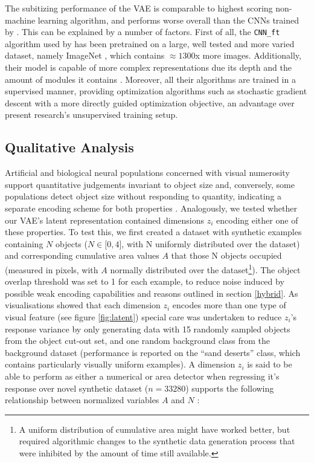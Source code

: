 \documentclass[twocolumn]{article}
\begin{document}
{The subitizing performance of the VAE is comparable to highest scoring
non-machine learning algorithm, and performs worse overall than the CNNs
trained by \citet{zhang2016salient}. This can be explained by a number
of factors. First of all, the \texttt{CNN\_ft} algorithm used by
\citet{zhang2016salient} has been pretrained on a large, well tested and
more varied dataset, namely ImageNet \citep{russakovsky2015imagenet},
which contains \(\approx 1300\)x more images. Additionally, their model
is capable of more complex representations due its depth and the amount
of modules it contains \citep[the applied model from][ uses 22 compared
to the 12 in our approach]{szegedy2015going}. Moreover, all their
algorithms are trained in a supervised manner, providing optimization
algorithms such as stochastic gradient descent with a more directly
guided optimization objective, an advantage over present research's
unsupervised training setup.

\hypertarget{qualitative-analysis}{%
\subsection{Qualitative Analysis}\label{qualitative-analysis}}

Artificial and biological neural populations concerned with visual
numerosity support quantitative judgements invariant to object size and,
conversely, some populations detect object size without responding to
quantity, indicating a separate encoding scheme for both properties
\citep{stoianov2012, harvey2013topographic}. Analogously, we tested
whether our VAE's latent representation contained dimensions \(z_i\)
encoding either one of these properties. To test this, we first created
a dataset with synthetic examples containing \(N\) objects
(\(N \in \lbrack 0, 4\rbrack\), with N uniformly distributed over the
dataset) and corresponding cumulative area values \(A\) that those N
objects occupied (measured in pixels, with \(A\) normally distributed
over the dataset\footnote{A uniform distribution of cumulative area
  might have worked better, but required algorithmic changes to the
  synthetic data generation process that were inhibited by the amount of
  time still available.}). The object overlap threshold was set to 1 for
each example, to reduce noise induced by possible weak encoding
capabilities and reasons outlined in section
\ref{hybrid}. As visualisations showed that each dimension \(z_i\) encodes more
than one type of visual feature (see figure \ref{fig:latent}) special care was
undertaken to reduce \(z_i\)'s response variance by only generating data
with 15 randomly sampled objects from the object cut-out set, and one
random background class from the background dataset (performance is
reported on the ``sand deserts'' class, which contains particularly
visually uniform examples). A dimension \(z_i\) is said to be able to
perform as either a numerical or area detector when regressing it's
response over novel synthetic dataset (\(n=33280\)) supports the
following relationship between normalized variables \(A\) and \(N\)
\citep{stoianov2012}:

}
\end{document}
